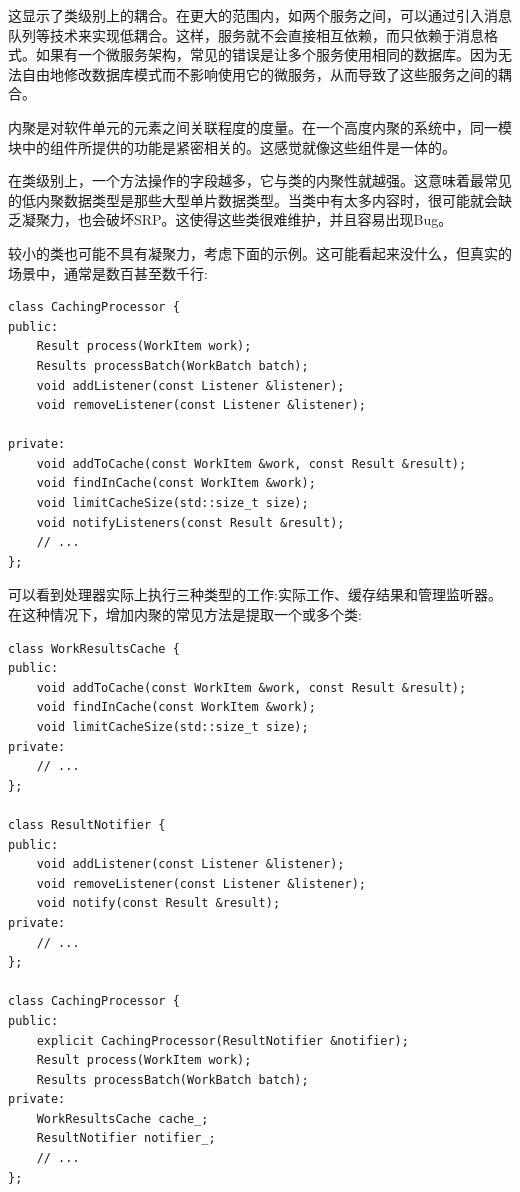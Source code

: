 这显示了类级别上的耦合。在更大的范围内，如两个服务之间，可以通过引入消息队列等技术来实现低耦合。这样，服务就不会直接相互依赖，而只依赖于消息格式。如果有一个微服务架构，常见的错误是让多个服务使用相同的数据库。因为无法自由地修改数据库模式而不影响使用它的微服务，从而导致了这些服务之间的耦合。


内聚是对软件单元的元素之间关联程度的度量。在一个高度内聚的系统中，同一模块中的组件所提供的功能是紧密相关的。这感觉就像这些组件是一体的。

在类级别上，一个方法操作的字段越多，它与类的内聚性就越强。这意味着最常见的低内聚数据类型是那些大型单片数据类型。当类中有太多内容时，很可能就会缺乏凝聚力，也会破坏SRP。这使得这些类很难维护，并且容易出现Bug。

较小的类也可能不具有凝聚力，考虑下面的示例。这可能看起来没什么，但真实的场景中，通常是数百甚至数千行:

\begin{lstlisting}[style=styleCXX]
class CachingProcessor {
public:
	Result process(WorkItem work);
	Results processBatch(WorkBatch batch);
	void addListener(const Listener &listener);
	void removeListener(const Listener &listener);
	
private:
	void addToCache(const WorkItem &work, const Result &result);
	void findInCache(const WorkItem &work);
	void limitCacheSize(std::size_t size);
	void notifyListeners(const Result &result);
	// ...
};
\end{lstlisting}

可以看到处理器实际上执行三种类型的工作:实际工作、缓存结果和管理监听器。在这种情况下，增加内聚的常见方法是提取一个或多个类:

\begin{lstlisting}[style=styleCXX]
class WorkResultsCache {
public:
	void addToCache(const WorkItem &work, const Result &result);
	void findInCache(const WorkItem &work);
	void limitCacheSize(std::size_t size);
private:
	// ...
};

class ResultNotifier {
public:
	void addListener(const Listener &listener);
	void removeListener(const Listener &listener);
	void notify(const Result &result);
private:
	// ...
};

class CachingProcessor {
public:
	explicit CachingProcessor(ResultNotifier &notifier);
	Result process(WorkItem work);
	Results processBatch(WorkBatch batch);
private:
	WorkResultsCache cache_;
	ResultNotifier notifier_;
	// ...
};
\end{lstlisting}

